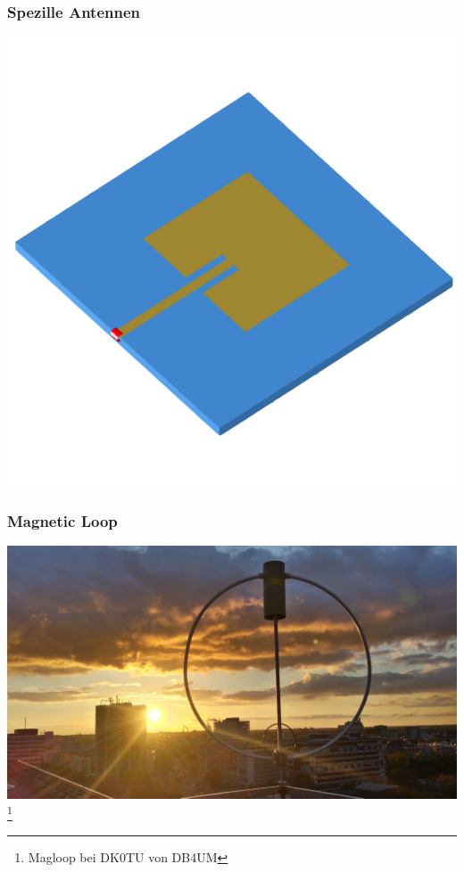 \begin{frame}
    \frametitle{Spezille Antennen}
    \begin{center}
        \includegraphics[width=1\textwidth]{a09/patch.png}
        
	\end{center}
\end{frame}

\begin{frame}
    \frametitle{Magnetic Loop}
    \begin{center}
        \includegraphics[width=1\textwidth]{a09/Magloop.jpg}
        \footnote{\tiny Magloop bei DK0TU von DB4UM}
	\end{center}
\end{frame}

